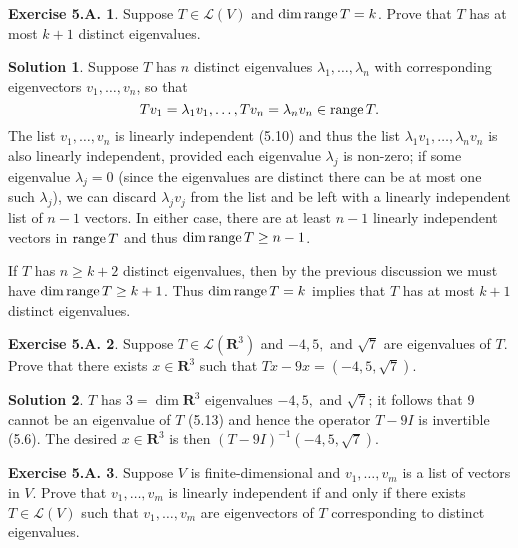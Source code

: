 \documentclass[12pt]{article}
\theoremstyle{definition}
\theoremstyle{exercise}
\newtheorem{exercise}{Exercise 5.A.}
\theoremstyle{solution}
\newtheorem*{solution}{Solution}
\newcommand{\lmap}{\mathcal{L}}
\newcommand{\Range}{\text{range\,}}
\newcommand{\R}{\mathbf{R}}
\begin{document}
\begin{exercise}
\label{ex:29}
    Suppose \( T \in \lmap(V) \) and \( \dim \Range T = k \). Prove that \( T \) has at most \( k + 1 \) distinct eigenvalues.
\end{exercise}

\begin{solution}
    Suppose \( T \) has \( n \) distinct eigenvalues \( \lambda_1, \ldots, \lambda_n \) with corresponding eigenvectors \( v_1, \ldots, v_n \), so that
    \[
        Tv_1 = \lambda_1 v_1, \ldots, Tv_n = \lambda_n v_n \in \Range T.
    \]
    The list \( v_1, \ldots, v_n \) is linearly independent (5.10) and thus the list \( \lambda_1 v_1, \ldots, \lambda_n v_n \) is also linearly independent, provided each eigenvalue \( \lambda_j \) is non-zero; if some eigenvalue \( \lambda_j = 0 \) (since the eigenvalues are distinct there can be at most one such \( \lambda_j \)), we can discard \( \lambda_j v_j \) from the list and be left with a linearly independent list of \( n - 1 \) vectors. In either case, there are at least \( n - 1 \) linearly independent vectors in \( \Range T \) and thus \( \dim \Range T \geq n - 1 \).

    If \( T \) has \( n \geq k + 2 \) distinct eigenvalues, then by the previous discussion we must have \( \dim \Range T \geq k + 1 \). Thus \( \dim \Range T = k \) implies that \( T \) has at most \( k + 1 \) distinct eigenvalues.
\end{solution}

\begin{exercise}
\label{ex:30}
    Suppose \( T \in \lmap(\R^3) \) and \( -4, 5, \) and \( \sqrt{7} \) are eigenvalues of \( T \). Prove that there exists \( x \in \R^3 \) such that \( Tx - 9x = (-4, 5, \sqrt{7}) \).
\end{exercise}

\begin{solution}
    \( T \) has \( 3 = \dim \R^3 \) eigenvalues \( -4, 5, \) and \( \sqrt{7} \); it follows that 9 cannot be an eigenvalue of \( T \) (5.13) and hence the operator \( T - 9I \) is invertible (5.6). The desired \( x \in \R^3 \) is then \( (T - 9I)^{-1}(-4, 5, \sqrt{7}) \).
\end{solution}

\begin{exercise}
\label{ex:31}
    Suppose \( V \) is finite-dimensional and \( v_1, \ldots, v_m \) is a list of vectors in \( V \). Prove that \( v_1, \ldots, v_m \) is linearly independent if and only if there exists \( T \in \lmap(V) \) such that \( v_1, \ldots, v_m \) are eigenvectors of \( T \) corresponding to distinct eigenvalues.
\end{exercise}
\end{document}
